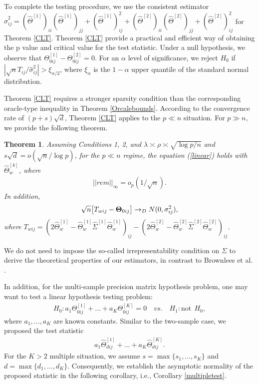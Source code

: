\documentclass[review]{elsarticle}
\newcommand{\1}{{\bf 1}}
\newcommand{\0}{{\bf 0}}
\newcommand{\bqa}{\begin{eqnarray}}
\newcommand{\eqa}{\end{eqnarray}}
\newtheorem{thm}{Theorem}
\begin{document}
 To complete the testing procedure, we use the consistent estimator
$\hat\sigma_{ij}^2=(\widehat{\Theta}^{[1]})_{ii}(\widehat{\Theta}^{[1]})_{jj}
 +(\widehat{\Theta}^{[1]})_{ij}^2+(\widehat{\Theta}^{[2]})_{ii}(\widehat{\Theta}^{[2]})_{jj}
 +(\widehat{\Theta}^{[2]})_{ij}^2$ for Theorem \ref{CLT}.
 Theorem \ref{CLT} provide a practical and efficient way of obtaining the p value and critical value for the test statistic.
 Under a null hypothesis, we observe that $\Theta_{0ij}^{[1]}-
\Theta_{0ij}^{[2]}=0$.
 For an $\alpha$ level of significance, we reject $H_0$ if $|\sqrt{n}T_{ij}/\hat\sigma_{ij}^2| > \xi_{\alpha/2}$, where $\xi_{\alpha}$ is the $1-\alpha$ upper quantile of the standard normal distribution.

 Theorem \ref{CLT} requires a stronger sparsity condition than the corresponding oracle-type inequality in Theorem \ref{Orcalebounds}.
 According to the convergence rate of $(p+s)\sqrt{d}$, Theorem \ref{CLT} applies to the $p\ll n$ situation.
 For $p\gg n$, we provide the following theorem.

\begin{thm}\label{weiverclt}
 Assuming Conditions 1, 2, and $\lambda\asymp \rho \asymp \sqrt{\log p/n}$ and $s\sqrt{d}=o(\sqrt{n}/\log p)$, for the $p\ll n$ regime, the equation (\ref{linear}) holds with $\widehat{\Theta}_w^{[k]}$, where
\bqa
||rem||_{\infty}=o_{p}(1/\sqrt{n}).
\eqa
 In addition,
\bqa
\sqrt{n}\big[T_{wij}-{\bf \Theta}_{0ij}\big]\to_{D}N(0,\sigma_{ij}^2),
\eqa
 where $T_{wij}=(2\widehat{\Theta}_{w}^{[1]}-\widehat{\Theta}_{w}^{[1]}
\widehat{\Sigma}^{[1]}\widehat{\Theta}_{w}^{[1]})_{ij}-(2\widehat{\Theta}_w^{[2]}
-\widehat{\Theta}_w^{[2]}
\widehat{\Sigma}^{[2]}\widehat{\Theta}_w^{[2]})_{ij}$.
\end{thm}

 We do not need to impose the so-called irrepresentability condition on $\Sigma$ to derive the theoretical properties of our estimators, in contrast to Brownlees et al. \cite{brownlees2018realized}.


 In addition, for the multi-sample precision matrix hypothesis problem, one may want to test
 a linear hypothesis testing problem:
\bqa
H_0: a_1\Theta^{[1]}_{0ij}+...+a_K\Theta^{[K]}_{0ij}=0 \quad vs. \quad H_1: \mbox{not} \ \ H_0,
\eqa
 where $a_1,...,a_K$ are known constants.
 Similar to the two-sample case, we proposed the test statistic
\bqa
a_1\widehat{{\Theta}}^{[1]}_{dij}
+...+a_K\widehat{{\Theta}}^{[K]}_{dij}.
\eqa
 For the $K>2$ multiple situation, we assume $s=\max\{s_1,...,s_K\}$ and $d=\max\{d_1,...,d_K\}$.
 Consequently, we establish the asymptotic normality of the proposed statistic in the following corollary, i.e., Corollary \ref{multipletest}.
\end{document}
